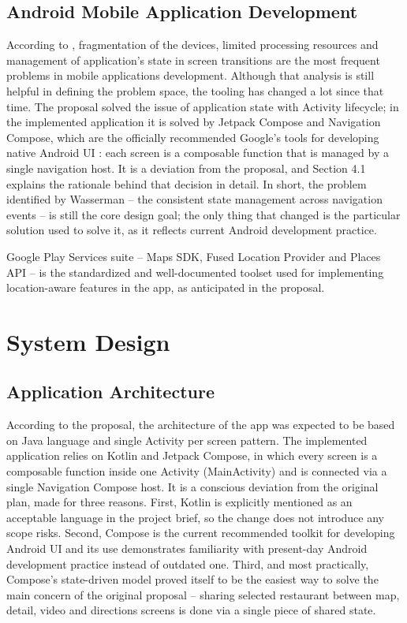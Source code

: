 \documentclass[12pt, a4paper]{article}
\begin{document}
\subsection{Android Mobile Application Development}

According to \citet{wasserman2010}, fragmentation of the devices, limited processing resources and management of application's state in screen transitions are the most frequent problems in mobile applications development. Although that analysis is still helpful in defining the problem space, the tooling has changed a lot since that time. The proposal solved the issue of application state with Activity lifecycle; in the implemented application it is solved by Jetpack Compose and Navigation Compose, which are the officially recommended Google's tools for developing native Android UI \citep{jetpack_compose}: each screen is a composable function that is managed by a single navigation host. It is a deviation from the proposal, and Section 4.1 explains the rationale behind that decision in detail. In short, the problem identified by Wasserman -- the consistent state management across navigation events -- is still the core design goal; the only thing that changed is the particular solution used to solve it, as it reflects current Android development practice.

Google Play Services suite -- Maps SDK, Fused Location Provider and Places API -- is the standardized and well-documented toolset used for implementing location-aware features in the app, as anticipated in the proposal.

\section{System Design}

\subsection{Application Architecture}

According to the proposal, the architecture of the app was expected to be based on Java language and single Activity per screen pattern. The implemented application relies on Kotlin and Jetpack Compose, in which every screen is a composable function inside one Activity (MainActivity) and is connected via a single Navigation Compose host. It is a conscious deviation from the original plan, made for three reasons. First, Kotlin is explicitly mentioned as an acceptable language in the project brief, so the change does not introduce any scope risks. Second, Compose is the current recommended toolkit for developing Android UI and its use demonstrates familiarity with present-day Android development practice instead of outdated one. Third, and most practically, Compose's state-driven model proved itself to be the easiest way to solve the main concern of the original proposal -- sharing selected restaurant between map, detail, video and directions screens is done via a single piece of shared state.
\end{document}
